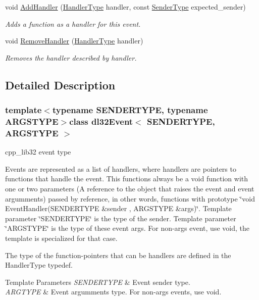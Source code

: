 \begin{DoxyCompactItemize}
void \hyperlink{classdl32_event_a06d930f3e641708d2063ad0ce6b8709d}{Add\-Handler} (\hyperlink{classdl32_event_a38bb65a0ecb861ef8cf99cc22bf2b393}{Handler\-Type} handler, const \hyperlink{classdl32_event_a9117f53a76ba65e2bd3e81b4e284fc99}{Sender\-Type} expected\-\_\-sender)
\begin{DoxyCompactList}\small\item\em Adds a function as a handler for this event. \end{DoxyCompactList}\item 
void \hyperlink{classdl32_event_adec5aedb6b5e779179ff3acd7942aefb}{Remove\-Handler} (\hyperlink{classdl32_event_a38bb65a0ecb861ef8cf99cc22bf2b393}{Handler\-Type} handler)
\begin{DoxyCompactList}\small\item\em Removes the handler described by handler. \end{DoxyCompactList}\end{DoxyCompactItemize}


\subsection{Detailed Description}
\subsubsection*{template$<$typename S\-E\-N\-D\-E\-R\-T\-Y\-P\-E, typename A\-R\-G\-S\-T\-Y\-P\-E$>$class dl32\-Event$<$ S\-E\-N\-D\-E\-R\-T\-Y\-P\-E, A\-R\-G\-S\-T\-Y\-P\-E $>$}

cpp\-\_\-lib32 event type 

Events are represented as a list of handlers, where handlers are pointers to functions that handle the event. This functions always be a void function with one or two parameters (A reference to the object that raises the event and event argumments) passed by reference, in other words, functions with prototype \char`\"{}void Event\-Handler(\-S\-E\-N\-D\-E\-R\-T\-Y\-P\-E \&sender , A\-R\-G\-S\-T\-Y\-P\-E \&args)\char`\"{}. Template parameter \char`\"{}\-S\-E\-N\-D\-E\-R\-T\-Y\-P\-E\char`\"{} is the type of the sender. Template parameter \char`\"{}\-A\-R\-G\-S\-T\-Y\-P\-E\char`\"{} is the type of these event args. For non-\/args event, use void, the template is specialized for that case.

The type of the function-\/pointers that can be handlers are defined in the Handler\-Type typedef. 
\begin{DoxyTemplParams}{Template Parameters}
{\em S\-E\-N\-D\-E\-R\-T\-Y\-P\-E} & Event sender type. \\
\hline
{\em A\-R\-G\-T\-Y\-P\-E} & Event argumments type. For non-\/args events, use void. \\
\hline
\end{DoxyTemplParams}


